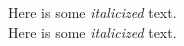 \documentclass{book}
\begin{document}
\noindent
Here is some {\it italicized} text.\\
Here is some {\it italicized\/} text.
\end{document}
